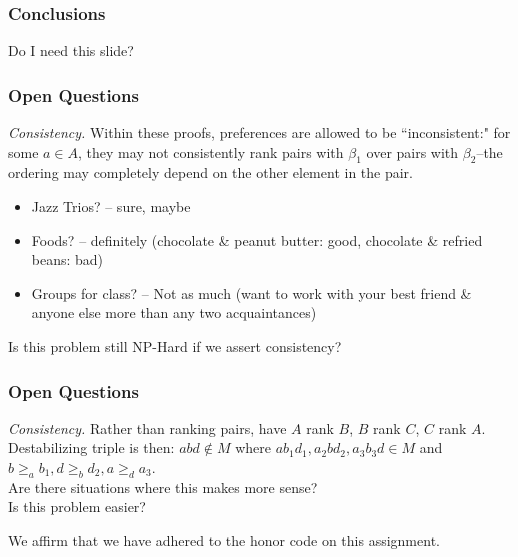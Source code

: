 \documentclass[mathserif,serif]{beamer}
\newcommand{\honor}{We affirm that we have adhered to the honor code on this assignment.}
\begin{document}
\begin{frame}

	\frametitle{Conclusions}
	
	Do I need this slide?
	
\end{frame}

\begin{frame}

	\frametitle{Open Questions}
		
	\emph{Consistency.} Within these proofs, preferences are allowed to be ``inconsistent:" for some $a \in A$, they may not consistently rank pairs with $\beta_1$ over pairs with $\beta_2$--the ordering may completely depend on the other element in the pair. \\
	
		\begin{itemize}Does this ``make sense"/seem reasonable?\\ 
			\item Jazz Trios? -- sure, maybe\\
			\item Foods? -- definitely (chocolate \& peanut butter: good, chocolate \& refried beans: bad)\\
			\item Groups for class? -- Not as much (want to work with your best friend \& anyone else more than any two acquaintances)\\
		\end{itemize}
	\newline
	Is this problem still NP-Hard if we assert consistency?
	\newline
\end{frame}
\begin{frame}
	\frametitle{Open Questions}
	\emph{Consistency.} Rather than ranking pairs, have $A$ rank $B$, $B$ rank $C$, $C$ rank $A$.  \\
	Destabilizing triple is then: $abd \notin M$ where $a b_1 d_1, a_2 b d_2, a_3 b_3 d \in M$ and $b \geq_a b_1, d \geq_b d_2, a \geq_d a_3$.\\
	
	Are there situations where this makes more sense?\\ %
	Is this problem easier?
	 
\end{frame}

\begin{frame}
	\honor
\end{frame}
\end{document}
